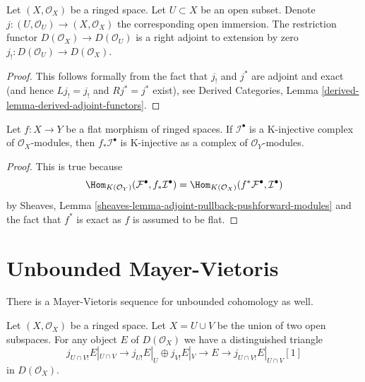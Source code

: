 \begin{lemma}
\label{lemma-adjoint-lower-shriek-restrict}
Let $(X, \mathcal{O}_X)$ be a ringed space. Let $U \subset X$ be an
open subset. Denote $j : (U, \mathcal{O}_U) \to (X, \mathcal{O}_X)$
the corresponding open immersion. The restriction functor
$D(\mathcal{O}_X) \to D(\mathcal{O}_U)$ is a right adjoint to
extension by zero $j_! : D(\mathcal{O}_U) \to D(\mathcal{O}_X)$.
\end{lemma}

\begin{proof}
This follows formally from the fact that $j_!$ and $j^*$ are adjoint and
exact (and hence $Lj_! = j_!$ and $Rj^* = j^*$ exist), see
Derived Categories, Lemma \ref{derived-lemma-derived-adjoint-functors}.
\end{proof}

\begin{lemma}
\label{lemma-K-injective-flat}
Let $f : X \to Y$ be a flat morphism of ringed spaces.
If $\mathcal{I}^\bullet$ is a K-injective complex of $\mathcal{O}_X$-modules,
then $f_*\mathcal{I}^\bullet$ is K-injective as a complex of
$\mathcal{O}_Y$-modules.
\end{lemma}

\begin{proof}
This is true because
$$
\Hom_{K(\mathcal{O}_Y)}(\mathcal{F}^\bullet, f_*\mathcal{I}^\bullet)
=
\Hom_{K(\mathcal{O}_X)}(f^*\mathcal{F}^\bullet, \mathcal{I}^\bullet)
$$
by
Sheaves, Lemma
\ref{sheaves-lemma-adjoint-pullback-pushforward-modules}
and the fact that $f^*$ is exact as $f$ is assumed to be flat.
\end{proof}





\section{Unbounded Mayer-Vietoris}
\label{section-unbounded-mayer-vietoris}

\noindent
There is a Mayer-Vietoris sequence for unbounded cohomology as well.

\begin{lemma}
\label{lemma-exact-sequence-lower-shriek}
Let $(X, \mathcal{O}_X)$ be a ringed space.
Let $X = U \cup V$ be the union of two open subspaces.
For any object $E$ of $D(\mathcal{O}_X)$ we have a distinguished
triangle
$$
j_{U \cap V!}E|_{U \cap V} \to
j_{U!}E|_U \oplus j_{V!}E|_V \to E \to
j_{U \cap V!}E|_{U \cap V}[1]
$$
in $D(\mathcal{O}_X)$.
\end{lemma}

